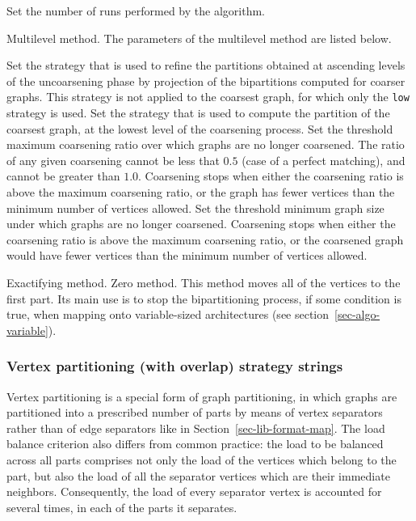 \begin{itemize}
\begin{itemize}
\iteme[{\tt pass=}{\it nbr}]
Set the number of runs performed by the algorithm.
\end{itemize}
\iteme[{\tt m}]
Multilevel method. The parameters of the multilevel method are listed below.
\begin{itemize}
\iteme[{\tt asc=}{\it strat}]
Set the strategy that is used to refine the partitions obtained
at ascending levels of the uncoarsening phase by projection of the
bipartitions computed for coarser graphs.
This strategy is not applied to the coarsest graph, for which only the
{\tt low} strategy is used.
\iteme[{\tt low=}{\it strat}]
Set the strategy that is used to compute the partition of the
coarsest graph, at the lowest level of the coarsening process.
\iteme[{\tt rat=}{\it rat}]
Set the threshold maximum coarsening ratio over which graphs are no longer
coarsened. The ratio of any given coarsening cannot be less that $0.5$
(case of a perfect matching), and cannot be greater than $1.0$.
Coarsening stops when either the coarsening ratio is above the maximum
coarsening ratio, or the graph has fewer vertices than the minimum number of
vertices allowed.
\iteme[{\tt vert=}{\it nbr}]
Set the threshold minimum graph size under which graphs are no longer
coarsened. Coarsening stops when either the coarsening ratio is above the
maximum coarsening ratio, or the coarsened graph would have fewer
vertices than the minimum number of vertices allowed.
\end{itemize}
\iteme[{\tt x}]
Exactifying method.
\iteme[{\tt z}]
Zero method. This method moves all of the vertices to the first
part. Its main use is to stop the bipartitioning process, if some
condition is true, when mapping onto variable-sized architectures (see
section~\ref{sec-algo-variable}).
\end{itemize}

\subsubsection{Vertex partitioning (with overlap) strategy strings}
\label{sec-lib-format-part-ovl}

Vertex partitioning is a special form of graph partitioning, in which
graphs are partitioned into a prescribed number of parts by means of
vertex separators rather than of edge separators like in
Section~\ref{sec-lib-format-map}. The load balance criterion also
differs from common practice: the load to be balanced across all parts
comprises not only the load of the vertices which belong to the part,
but also the load of all the separator vertices which are their
immediate neighbors. Consequently, the load of every separator vertex
is accounted for several times, in each of the parts it separates.

